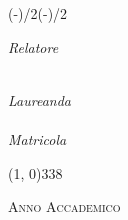 \begin{titlepage}
\begin{adjustwidth}{(\evensidemargin-\oddsidemargin)/2}{(\oddsidemargin-\evensidemargin)/2}
\begin{center}
            \vfill

            \begin{large}
                \begin{flushleft}
                    \textit{Relatore}\\
                    \vspace{5pt}
                    \profTitle\ \myProf
                \end{flushleft}


                \begin{flushright}
                    \textit{Laureanda}\\
                    \vspace{5pt}
                    \myName \\
                    \vspace{5pt}
                    \textit{Matricola} \myID
                \end{flushright}
            \end{large}

            \vfill

            \line(1, 0){338} \\
            \begin{normalsize}
                \textsc{Anno Accademico \myAA}
            \end{normalsize}
        \end{center}
    \end{adjustwidth}
\end{titlepage}
